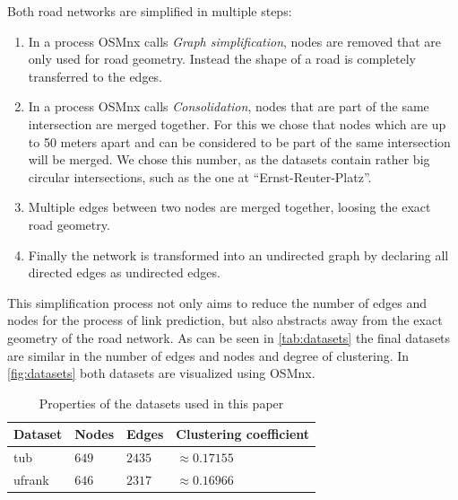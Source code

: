 \documentclass[12pt,a4paper]{IEEEtran}
\begin{document}
Both road networks are simplified in multiple steps:
\begin{enumerate}
\item In a process OSMnx calls \emph{Graph simplification}, nodes are removed that are only used for road geometry.
      Instead the shape of a road is completely transferred to the edges.\endnotemark\addtocounter{endnote}{-1}
\item In a process OSMnx calls \emph{Consolidation},
      nodes that are part of the same intersection are merged together.\endnotemark
      For this we chose that nodes which are up to 50 meters apart and can be considered to be part of the same intersection will be merged.
      We chose this number, as the datasets contain rather big circular intersections,
      such as the one at \enquote{\foreignlanguage{ngerman}{Ernst-Reuter-Platz}}.
\item Multiple edges between two nodes are merged together, loosing the exact road geometry.
\item Finally the network is transformed into an undirected graph by declaring all directed edges as undirected edges.
\end{enumerate}

This simplification process not only aims to reduce the number of edges and nodes for the process of link prediction,
but also abstracts away from the exact geometry of the road network.
As can be seen in \autoref{tab:datasets} the final datasets are similar in the number of edges and nodes and degree of clustering.
In \autoref{fig:datasets} both datasets are visualized using OSMnx.

\begin{table}[tb]
\centering
\caption{Properties of the datasets used in this paper}
\label{tab:datasets}
\begin{tabularx}{\columnwidth}{XXXX}
\toprule
Dataset &Nodes     &Edges     &Clustering coefficient\\
\midrule
tub     &\(649\)   &\(2435\)  &\(\approx 0.17155\)\\
ufrank  &\(646\)   &\(2317\)  &\(\approx 0.16966\)\\
\bottomrule
\end{tabularx}
\end{table}
\end{document}
